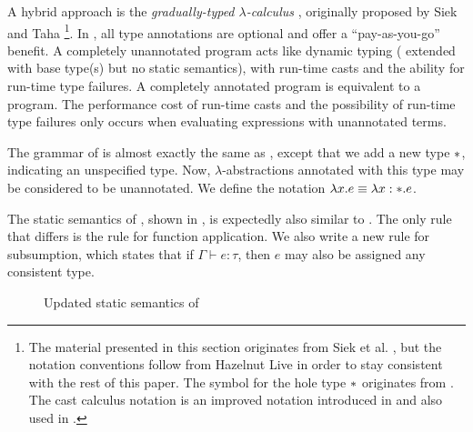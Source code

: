 A hybrid approach is the \textit{gradually-typed $\lambda$-calculus} \gtlc{}, originally proposed by Siek and Taha \cite{Siek06gradualtyping,siek2015refined}\footnote{The material presented in this section originates from Siek et al. \cite{Siek06gradualtyping,siek2015refined}, but the notation conventions follow from Hazelnut Live \cite{conf/popl/HazelnutLive19} in order to stay consistent with the rest of this paper. The symbol for the hole type $*{}$ originates from \cite{siek2015refined}. The cast calculus notation is an improved notation introduced in \cite{siek2015refined} and also used in \cite{conf/popl/HazelnutLive19}.}. In \gtlc{}, all type annotations are optional and offer a ``pay-as-you-go'' benefit. A completely unannotated \gtlc{} program acts like dynamic typing (\ulc{} extended with base type(s) but no static semantics), with run-time casts and the ability for run-time type failures. A completely annotated \gtlc{} program is equivalent to a \stlc{} program. The performance cost of run-time casts and the possibility of run-time type failures only occurs when evaluating expressions with unannotated terms.

The grammar of \gtlc{} is almost exactly the same as \stlc, except that we add a new type $*$, indicating an unspecified type. Now, $\lambda$-abstractions annotated with this type may be considered to be unannotated. We define the notation $\lambda x.e\equiv\lambda x:*.e$.

The static semantics of \gtlc{}, shown in , is expectedly also similar to \stlc. The only rule that differs is the rule for function application. We also write a new rule for subsumption, which states that if $\Gamma\vdash e:\tau$, then $e$ may also be assigned any consistent type.

\begin{figure}
  \centering
  \begin{mdframed}
    \begin{singlespace}
    \end{singlespace}
  \end{mdframed}
  \caption{Updated static semantics of \gtlc}
  \label{fig:statics-gtlc}
\end{figure}

